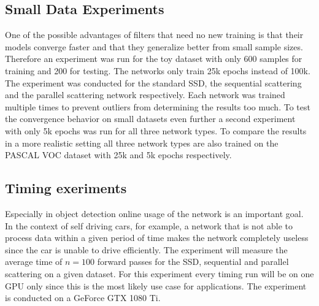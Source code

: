 \subsection{Small Data Experiments}
\label{subsec:small_data_experiments}

One of the possible advantages of filters that need no new training is that their models converge faster and that they generalize better from small sample sizes. Therefore an experiment was run for the toy dataset with only 600 samples for training and 200 for testing. The networks only train 25k epochs instead of 100k. The experiment was conducted for the standard SSD, the sequential scattering and the parallel scattering network respectively. Each network was trained multiple times to prevent outliers from determining the results too much. To test the convergence behavior on small datasets even further a second experiment with only 5k epochs was run for all three network types. To compare the results in a more realistic setting all three network types are also trained on the PASCAL VOC dataset with 25k and 5k epochs respectively. 


\subsection{Timing exeriments}
\label{subsec:timing_experiments}

Especially in object detection online usage of the network is an important goal. In the context of self driving cars, for example, a network that is not able to process data within a given period of time makes the network completely useless since the car is unable to drive efficiently. The experiment will measure the average time of $n=100$ forward passes for the SSD, sequential and parallel scattering on a given dataset. For this experiment every timing run will be on one GPU only since this is the most likely use case for applications. The experiment is conducted on a GeForce GTX 1080 Ti.
